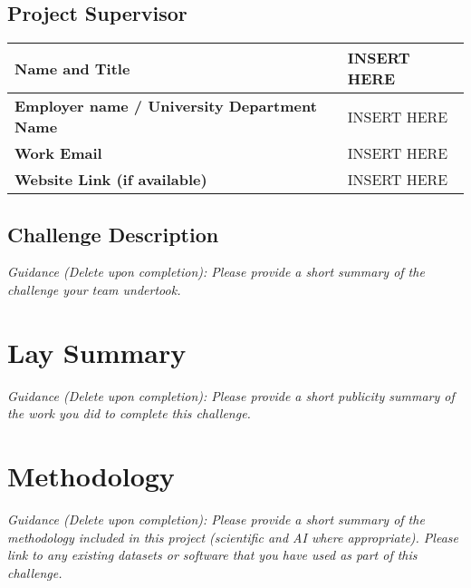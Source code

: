 \documentclass[11pt, titlepage]{article}
\begin{document}
\subsection{Project Supervisor}
\begin{table}[H]
	\centering
	\begin{tabular}{|p{2in}|p{4in}|}
		\hline
		\textbf{Name and Title} & INSERT HERE \\ %
		\hline
		\textbf{Employer name / University Department Name} & 
		INSERT HERE \\ %
		\hline
		\textbf{Work Email} & 
		INSERT HERE \\ %
		\hline
		\textbf{Website Link (if available)} & 
		INSERT HERE \\ %
		\hline		
	\end{tabular}
\end{table}


\subsection{Challenge Description}
\label{section:challenge}
\textit{Guidance (Delete upon completion): Please provide a short summary of the challenge your team undertook.}


\section{Lay Summary}
\label{section:lay_summary}
\textit{Guidance (Delete upon completion): Please provide a short publicity summary of the work you did to complete this challenge.}

\section{Methodology}
\label{section:methodology}
\textit{Guidance (Delete upon completion): Please provide a short summary of the methodology included in this project (scientific and AI where appropriate). Please link to any existing datasets or software that you have used as part of this challenge. }
\end{document}
